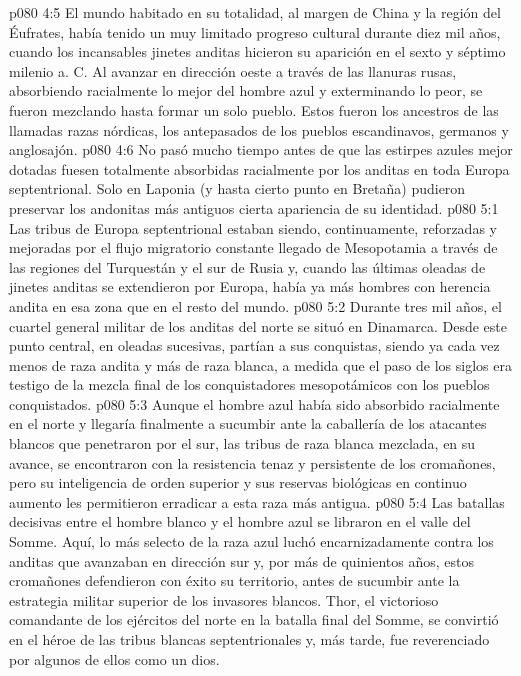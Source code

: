 \vs p080 4:5 El mundo habitado en su totalidad, al margen de China y la región del Éufrates, había tenido un muy limitado progreso cultural durante diez mil años, cuando los incansables jinetes anditas hicieron su aparición en el sexto y séptimo milenio a. C. Al avanzar en dirección oeste a través de las llanuras rusas, absorbiendo racialmente lo mejor del hombre azul y exterminando lo peor, se fueron mezclando hasta formar un solo pueblo. Estos fueron los ancestros de las llamadas razas nórdicas, los antepasados de los pueblos escandinavos, germanos y anglosajón.
\vs p080 4:6 \pc No pasó mucho tiempo antes de que las estirpes azules mejor dotadas fuesen totalmente absorbidas racialmente por los anditas en toda Europa septentrional. Solo en Laponia (y hasta cierto punto en Bretaña) pudieron preservar los andonitas más antiguos cierta apariencia de su identidad.
\vs p080 5:1 Las tribus de Europa septentrional estaban siendo, continuamente, reforzadas y mejoradas por el flujo migratorio constante llegado de Mesopotamia a través de las regiones del Turquestán y el sur de Rusia y, cuando las últimas oleadas de jinetes anditas se extendieron por Europa, había ya más hombres con herencia andita en esa zona que en el resto del mundo.
\vs p080 5:2 Durante tres mil años, el cuartel general militar de los anditas del norte se situó en Dinamarca. Desde este punto central, en oleadas sucesivas, partían a sus conquistas, siendo ya cada vez menos de raza andita y más de raza blanca, a medida que el paso de los siglos era testigo de la mezcla final de los conquistadores mesopotámicos con los pueblos conquistados.
\vs p080 5:3 \pc Aunque el hombre azul había sido absorbido racialmente en el norte y llegaría finalmente a sucumbir ante la caballería de los atacantes blancos que penetraron por el sur, las tribus de raza blanca mezclada, en su avance, se encontraron con la resistencia tenaz y persistente de los cromañones, pero su inteligencia de orden superior y sus reservas biológicas en continuo aumento les permitieron erradicar a esta raza más antigua.
\vs p080 5:4 Las batallas decisivas entre el hombre blanco y el hombre azul se libraron en el valle del Somme. Aquí, lo más selecto de la raza azul luchó encarnizadamente contra los anditas que avanzaban en dirección sur y, por más de quinientos años, estos cromañones defendieron con éxito su territorio, antes de sucumbir ante la estrategia militar superior de los invasores blancos. Thor, el victorioso comandante de los ejércitos del norte en la batalla final del Somme, se convirtió en el héroe de las tribus blancas septentrionales y, más tarde, fue reverenciado por algunos de ellos como un dios.
